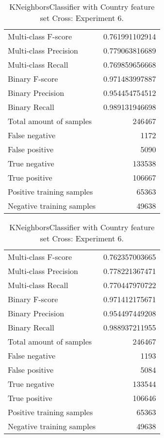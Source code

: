 \begin{table}[H]
\begin{minipage}{0.5\textwidth}
\caption{KNeighborsClassifier with Country feature set Cross: Experiment 5.}
\centering
\begin{tabular}{l r}
\toprule
Multi-class F-score & 0.761991102914 \\
Multi-class Precision & 0.779063816689 \\
Multi-class Recall & 0.769859656668 \\
\midrule
Binary F-score & 0.971483997887 \\
Binary Precision & 0.954454754512 \\
Binary Recall & 0.989131946698 \\
\midrule
Total amount of samples & 246467 \\
False negative & 1172 \\
False positive & 5090 \\
True negative & 133538 \\
True positive & 106667 \\
\midrule
Positive training samples & 65363 \\
Negative training samples & 49638 \\
\bottomrule
\end{tabular}
\end{minipage}
\hfillx
\begin{minipage}{0.5\textwidth}
\caption{KNeighborsClassifier with Country feature set Cross: Experiment 6.}
\centering
\begin{tabular}{l r}
\toprule
Multi-class F-score & 0.762357003665 \\
Multi-class Precision & 0.778221367471 \\
Multi-class Recall & 0.770447970722 \\
\midrule
Binary F-score & 0.971412175671 \\
Binary Precision & 0.954497449208 \\
Binary Recall & 0.988937211955 \\
\midrule
Total amount of samples & 246467 \\
False negative & 1193 \\
False positive & 5084 \\
True negative & 133544 \\
True positive & 106646 \\
\midrule
Positive training samples & 65363 \\
Negative training samples & 49638 \\
\bottomrule
\end{tabular}
\end{minipage}
\end{table}
